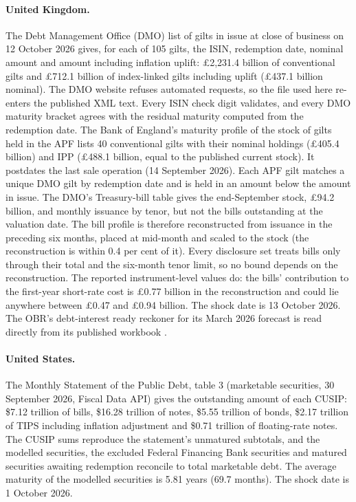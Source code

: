 \documentclass[11pt,a4paper]{article}
\theoremstyle{remark}
\begin{document}
\paragraph{United Kingdom.} The Debt Management Office (DMO) list of gilts in issue at close of business on 12 October 2026 gives, for each of 105 gilts, the ISIN, redemption date, nominal amount and amount including inflation uplift: £2,231.4 billion of conventional gilts and £712.1 billion of index-linked gilts including uplift (£437.1 billion nominal). The DMO website refuses automated requests, so the file used here re-enters the published XML text. Every ISIN check digit validates, and every DMO maturity bracket agrees with the residual maturity computed from the redemption date. The Bank of England's maturity profile of the stock of gilts held in the APF lists 40 conventional gilts with their nominal holdings (£405.4 billion) and IPP (£488.1 billion, equal to the published current stock). It postdates the last sale operation (14 September 2026). Each APF gilt matches a unique DMO gilt by redemption date and is held in an amount below the amount in issue. The DMO's Treasury-bill table gives the end-September stock, £94.2 billion, and monthly issuance by tenor, but not the bills outstanding at the valuation date. The bill profile is therefore reconstructed from issuance in the preceding six months, placed at mid-month and scaled to the stock (the reconstruction is within 0.4 per cent of it). Every disclosure set treats bills only through their total and the six-month tenor limit, so no bound depends on the reconstruction. The reported instrument-level values do: the bills' contribution to the first-year short-rate cost is £0.77 billion in the reconstruction and could lie anywhere between £0.47 and £0.94 billion. The shock date is 13 October 2026. The OBR's debt-interest ready reckoner for its March 2026 forecast is read directly from its published workbook \citep{OBR2026}.

\paragraph{United States.} The Monthly Statement of the Public Debt, table 3 (marketable securities, 30 September 2026, Fiscal Data API) gives the outstanding amount of each CUSIP: \$7.12 trillion of bills, \$16.28 trillion of notes, \$5.55 trillion of bonds, \$2.17 trillion of TIPS including inflation adjustment and \$0.71 trillion of floating-rate notes. The CUSIP sums reproduce the statement's unmatured subtotals, and the modelled securities, the excluded Federal Financing Bank securities and matured securities awaiting redemption reconcile to total marketable debt. The average maturity of the modelled securities is 5.81 years (69.7 months). The shock date is 1 October 2026.
\end{document}
